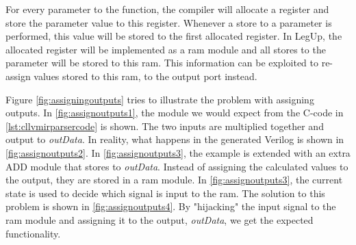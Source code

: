 For every parameter to the function, the compiler will allocate a register and store the parameter value to this register. Whenever a store to a parameter is performed, this value will be stored to the first allocated register. In LegUp, the allocated register will be implemented as a \gls{ram} module and all stores to the parameter will be stored to this ram. This information can be exploited to re-assign values stored to this \gls{ram}, to the output port instead.

Figure \ref{fig:assigningoutputs} tries to illustrate the problem with assigning outputs. In \cref{fig:assignoutputs1}, the module we would expect from the C-code in \cref{lst:cllvmirparsercode} is shown. The two inputs are multiplied together and output to \textit{outData}. In reality, what happens in the generated Verilog is shown in \cref{fig:assignoutputs2}. In \cref{fig:assignoutputs3}, the example is extended with an extra ADD module that stores to \textit{outData}. Instead of assigning the calculated values to the output, they are stored in a \gls{ram} module. In \cref{fig:assignoutputs3}, the current state is used to decide which signal is input to the \gls{ram}. The solution to this problem is shown in \cref{fig:assignoutputs4}. By "hijacking" the input signal to the \gls{ram} module and assigning it to the output, \textit{outData}, we get the expected functionality. 
